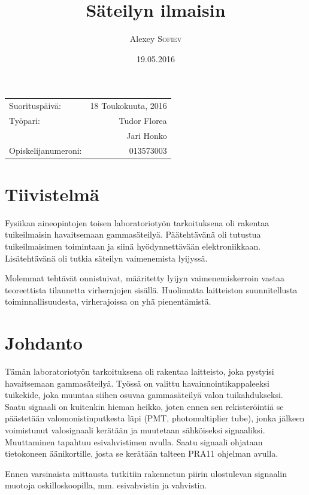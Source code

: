 \documentclass[a4paper, 12pt]{article}
\title{Säteilyn ilmaisin} %
\author{Alexey \textsc{Sofiev}} %
\date{19.05.2016} %
\begin{document}
\maketitle %

\begin{center}
\begin{tabular}{l r}
Suorituspäivä: & 18 Toukokuuta, 2016 \\ %
Työpari: & Tudor Florea \\ %
& Jari Honko \\
Opiskelijanumeroni: & 013573003 %
\end{tabular}
\end{center}

\clearpage
\section{Tiivistelmä}

Fysiikan aineopintojen toisen laboratoriotyön tarkoituksena oli rakentaa tuikeilmaisin havaitsemaan gammasäteilyä. Päätehtävänä oli tutustua tuikeilmaisimen toimintaan ja siinä hyödynnettävään elektroniikkaan. Lisätehtävänä oli tutkia säteilyn vaimenemista lyijyssä.

Molemmat tehtävät onnistuivat, määritetty lyijyn vaimenemiskerroin vastaa teoreettista tilannetta virherajojen sisällä. Huolimatta laitteiston suunnitellusta toiminnallisuudesta, virherajoissa on yhä pienentämistä.

\clearpage

\section{Johdanto}

Tämän laboratoriotyön tarkoituksena oli rakentaa laitteisto, joka pystyisi havaitsemaan gammasäteilyä. Työssä on valittu havainnointikappaleeksi tuikekide, joka muuntaa siihen osuvaa gammasäteilyä valon tuikahdukseksi. Saatu signaali on kuitenkin hieman heikko, joten ennen sen rekisteröintiä se päästetään valomonistinputkesta läpi (PMT, photomultiplier tube), jonka jälkeen voimistunut valosignaali kerätään ja muutetaan sähköiseksi signaaliksi. Muuttaminen tapahtuu esivahvistimen avulla. Saatu signaali ohjataan tietokoneen äänikortille, josta se kerätään talteen PRA11 ohjelman avulla.

Ennen varsinaista mittausta tutkitiin rakennetun piirin ulostulevan signaalin muotoja oskilloskoopilla, mm. esivahvistin ja vahvistin.
\end{document}
